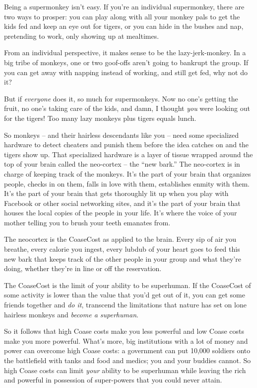 Being a supermonkey isn't easy. If you're an individual
supermonkey, there are two ways to prosper: you can play along with
all your monkey pals to get the kids fed and keep an eye out for
tigers, or you can hide in the bushes and nap, pretending to work,
only showing up at mealtimes.

From an individual perspective, it makes sense to be the
lazy-jerk-monkey. In a big tribe of monkeys, one or two goof-offs
aren't going to bankrupt the group. If you can get away with
napping instead of working, and still get fed, why not do it?

But if \emph{everyone} does it, so much for supermonkeys. Now no
one's getting the fruit, no one's taking care of the kids, and
damn, I thought \emph{you} were looking out for the tigers! Too
many lazy monkeys plus tigers equals lunch.

So monkeys -- and their hairless descendants like you -- need some
specialized hardware to detect cheaters and punish them before the
idea catches on and the tigers show up. That specialized hardware
is a layer of tissue wrapped around the top of your brain called
the neo-cortex -- the ``new bark.'' The neo-cortex is in charge of
keeping track of the monkeys. It's the part of your brain that
organizes people, checks in on them, falls in love with them,
establishes enmity with them. It's the part of your brain that gets
thoroughly lit up when you play with Facebook or other social
networking sites, and it's the part of your brain that houses the
local copies of the people in your life. It's where the voice of
your mother telling you to brush your teeth emanates from.

The neocortex is the CoaseCost as applied to the brain. Every sip
of air you breathe, every calorie you ingest, every lubdub of your
heart goes to feed this new bark that keeps track of the other
people in your group and what they're doing, whether they're in
line or off the reservation.

The CoaseCost is the limit of your ability to be superhuman. If the
CoaseCost of some activity is lower than the value that you'd get
out of it, you can get some friends together and \emph{do it},
transcend the limitations that nature has set on lone hairless
monkeys and \emph{become a superhuman}.

So it follows that high Coase costs make you less powerful and low
Coase costs make you more powerful. What's more, big institutions
with a lot of money and power can overcome high Coase costs: a
government can put 10,000 soldiers onto the battlefield with tanks
and food and medics; you and your buddies cannot. So high Coase
costs can limit \emph{your} ability to be superhuman while leaving
the rich and powerful in possession of super-powers that you could
never attain.


